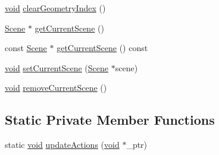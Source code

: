 \begin{DoxyCompactItemize}
\item 
\mbox{\hyperlink{_thread_8h_af1e856da2e658414cb2456cb6f7ebc66}{void}} \mbox{\hyperlink{classnjli_1_1_node_a0a07c5e7c436ed50072c78f4e7ed6d62}{clear\+Geometry\+Index}} ()
\item 
\mbox{\hyperlink{classnjli_1_1_scene}{Scene}} $\ast$ \mbox{\hyperlink{classnjli_1_1_node_a5cf39de8bc22ee961717ceee0a2c40c8}{get\+Current\+Scene}} ()
\item 
const \mbox{\hyperlink{classnjli_1_1_scene}{Scene}} $\ast$ \mbox{\hyperlink{classnjli_1_1_node_abd42c66830a9afad1acb368c98c5ae50}{get\+Current\+Scene}} () const
\item 
\mbox{\hyperlink{_thread_8h_af1e856da2e658414cb2456cb6f7ebc66}{void}} \mbox{\hyperlink{classnjli_1_1_node_a5f1c647c5bd283ac008106863c06406b}{set\+Current\+Scene}} (\mbox{\hyperlink{classnjli_1_1_scene}{Scene}} $\ast$scene)
\item 
\mbox{\hyperlink{_thread_8h_af1e856da2e658414cb2456cb6f7ebc66}{void}} \mbox{\hyperlink{classnjli_1_1_node_a7d33f50c3f40b5baf0d1a0028550a9fc}{remove\+Current\+Scene}} ()
\end{DoxyCompactItemize}
\subsection*{Static Private Member Functions}
\begin{DoxyCompactItemize}
\item 
static \mbox{\hyperlink{_thread_8h_af1e856da2e658414cb2456cb6f7ebc66}{void}} \mbox{\hyperlink{classnjli_1_1_node_a4d3f767e870dca336b5daabb1abc00ea}{update\+Actions}} (\mbox{\hyperlink{_thread_8h_af1e856da2e658414cb2456cb6f7ebc66}{void}} $\ast$\+\_\+ptr)
\end{DoxyCompactItemize}
